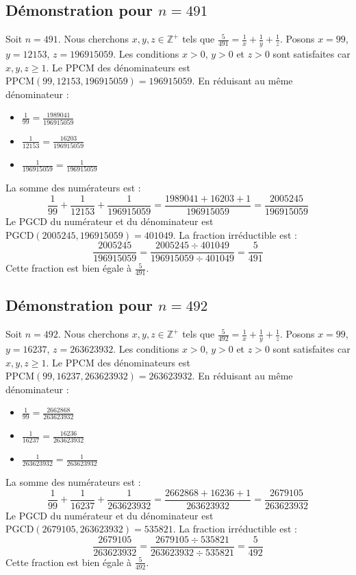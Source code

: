 \documentclass[11pt,a4paper]{article}
\begin{document}
\subsection{Démonstration pour $n = 491$}
Soit $n = 491$. Nous cherchons $x, y, z \in \mathbb{Z}^{+}$ tels que $\frac{5}{491} = \frac{1}{x} + \frac{1}{y} + \frac{1}{z}$.
Posons $x = 99$, $y = 12153$, $z = 196915059$.
Les conditions $x > 0$, $y > 0$ et $z > 0$ sont satisfaites car $x, y, z \geq 1$.
Le PPCM des dénominateurs est $\text{PPCM}(99, 12153, 196915059) = 196915059$.
En réduisant au même dénominateur :
\begin{itemize}
    \item $\frac{1}{99} = \frac{1989041}{196915059}$
    \item $\frac{1}{12153} = \frac{16203}{196915059}$
    \item $\frac{1}{196915059} = \frac{1}{196915059}$
\end{itemize}
La somme des numérateurs est :
$$ \frac{1}{99} + \frac{1}{12153} + \frac{1}{196915059} = \frac{1989041 + 16203 + 1}{196915059} = \frac{2005245}{196915059} $$
Le PGCD du numérateur et du dénominateur est $\text{PGCD}(2005245, 196915059) = 401049$.
La fraction irréductible est :
$$ \frac{2005245}{196915059} = \frac{2005245 \div 401049}{196915059 \div 401049} = \frac{5}{491} $$
Cette fraction est bien égale à $\frac{5}{491}$.

\subsection{Démonstration pour $n = 492$}
Soit $n = 492$. Nous cherchons $x, y, z \in \mathbb{Z}^{+}$ tels que $\frac{5}{492} = \frac{1}{x} + \frac{1}{y} + \frac{1}{z}$.
Posons $x = 99$, $y = 16237$, $z = 263623932$.
Les conditions $x > 0$, $y > 0$ et $z > 0$ sont satisfaites car $x, y, z \geq 1$.
Le PPCM des dénominateurs est $\text{PPCM}(99, 16237, 263623932) = 263623932$.
En réduisant au même dénominateur :
\begin{itemize}
    \item $\frac{1}{99} = \frac{2662868}{263623932}$
    \item $\frac{1}{16237} = \frac{16236}{263623932}$
    \item $\frac{1}{263623932} = \frac{1}{263623932}$
\end{itemize}
La somme des numérateurs est :
$$ \frac{1}{99} + \frac{1}{16237} + \frac{1}{263623932} = \frac{2662868 + 16236 + 1}{263623932} = \frac{2679105}{263623932} $$
Le PGCD du numérateur et du dénominateur est $\text{PGCD}(2679105, 263623932) = 535821$.
La fraction irréductible est :
$$ \frac{2679105}{263623932} = \frac{2679105 \div 535821}{263623932 \div 535821} = \frac{5}{492} $$
Cette fraction est bien égale à $\frac{5}{492}$.
\end{document}
